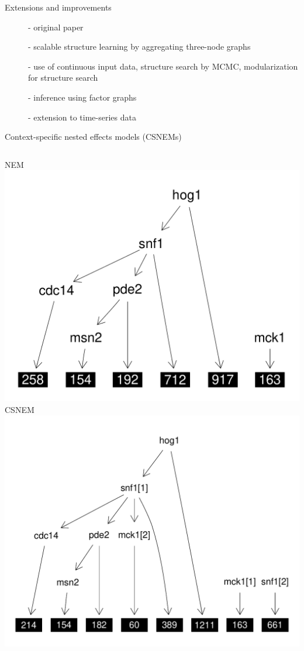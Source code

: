 \documentclass{beamer}
\begin{document}
\begin{frame}{Extensions and improvements}
\begin{description}
 \item[\cite{Markowetz01012005}] - original paper
 \item[\cite{markowetz2007nested}] - scalable structure learning by aggregating three-node graphs
 \item[\cite{frohlich2007large}] - use of continuous input data, structure search by MCMC, modularization for structure search
 \item[\cite{vaske2009factor}] - inference using factor graphs
 \item[\cite{anchang2009modeling}] - extension to time-series data
\end{description}
\end{frame}

\begin{frame}{Context-specific nested effects models (CSNEMs)}
\begin{columns}
NEM
\includegraphics[width=\textwidth]{nem}
CSNEM
\includegraphics[width=\textwidth]{csnem}
\end{columns}
\end{frame}
\end{document}
